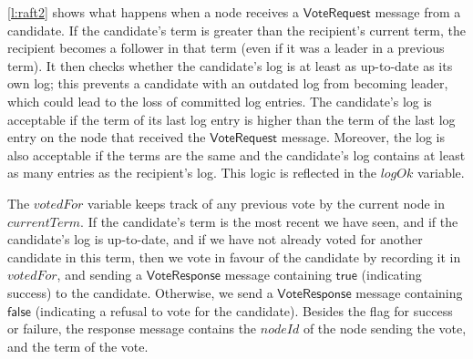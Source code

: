 \autoref{l:raft2} shows what happens when a node receives a $\mathsf{VoteRequest}$ message from a candidate.
If the candidate's term is greater than the recipient's current term, the recipient becomes a follower in that term (even if it was a leader in a previous term).
It then checks whether the candidate's log is at least as up-to-date as its own log; this prevents a candidate with an outdated log from becoming leader, which could lead to the loss of committed log entries.
The candidate's log is acceptable if the term of its last log entry is higher than the term of the last log entry on the node that received the $\mathsf{VoteRequest}$ message.
Moreover, the log is also acceptable if the terms are the same and the candidate's log contains at least as many entries as the recipient's log.
This logic is reflected in the $\mathit{logOk}$ variable.

The $\mathit{votedFor}$ variable keeps track of any previous vote by the current node in $\mathit{currentTerm}$.
If the candidate's term is the most recent we have seen, and if the candidate's log is up-to-date, and if we have not already voted for another candidate in this term, then we vote in favour of the candidate by recording it in $\mathit{votedFor}$, and sending a $\mathsf{VoteResponse}$ message containing $\mathsf{true}$ (indicating success) to the candidate.
Otherwise, we send a $\mathsf{VoteResponse}$ message containing $\mathsf{false}$ (indicating a refusal to vote for the candidate).
Besides the flag for success or failure, the response message contains the $\mathit{nodeId}$ of the node sending the vote, and the term of the vote.

